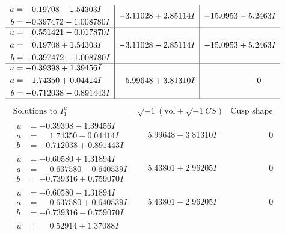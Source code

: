 \documentclass[1p]{elsarticle_modified}
\theoremstyle{definition}
\newcommand{\I}{\sqrt{-1}}
\begin{document}
$$\begin{array}{c|c|c}
\begin{aligned}
a &= \phantom{-}0.19708 - 1.54303 I \\
b &= -0.397472 - 1.008780 I\end{aligned}
 & -3.11028 + 2.85114 I & -15.0953 - 5.2463 I \\ \hline\begin{aligned}
u &= \phantom{-}0.551421 - 0.017870 I \\
a &= \phantom{-}0.19708 + 1.54303 I \\
b &= -0.397472 + 1.008780 I\end{aligned}
 & -3.11028 - 2.85114 I & -15.0953 + 5.2463 I \\ \hline\begin{aligned}
u &= -0.39398 + 1.39456 I \\
a &= \phantom{-}1.74350 + 0.04414 I \\
b &= -0.712038 - 0.891443 I\end{aligned}
 & \phantom{-}5.99648 + 3.81310 I & \phantom{-0.000000 } 0\\
 \hline 
 \end{array}$$\newpage$$\begin{array}{c|c|c}  
\text{Solutions to }I^u_{1}& \I (\text{vol} + \sqrt{-1}CS) & \text{Cusp shape}\\
 \hline 
\begin{aligned}
u &= -0.39398 - 1.39456 I \\
a &= \phantom{-}1.74350 - 0.04414 I \\
b &= -0.712038 + 0.891443 I\end{aligned}
 & \phantom{-}5.99648 - 3.81310 I & \phantom{-0.000000 } 0 \\ \hline\begin{aligned}
u &= -0.60580 + 1.31894 I \\
a &= \phantom{-}0.637580 - 0.640539 I \\
b &= -0.739316 + 0.759070 I\end{aligned}
 & \phantom{-}5.43801 + 2.96205 I & \phantom{-0.000000 } 0 \\ \hline\begin{aligned}
u &= -0.60580 - 1.31894 I \\
a &= \phantom{-}0.637580 + 0.640539 I \\
b &= -0.739316 - 0.759070 I\end{aligned}
 & \phantom{-}5.43801 - 2.96205 I & \phantom{-0.000000 } 0 \\ \hline\begin{aligned}
u &= \phantom{-}0.52914 + 1.37088 I \\

\end{aligned}
\end{array}$$
\end{document}
